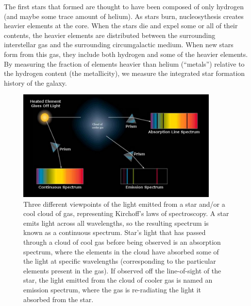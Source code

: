 The first stars that formed are thought to have been composed of only hydrogen 
(and maybe some trace amount of helium).  As stars burn, nucleosythesis creates 
heavier elements at the core.  When the stars die and expel some or all of their 
contents, the heavier elements are distributed between the surrounding 
interstellar gas and the surrounding circumgalactic medium.  When new stars form 
from this gas, they include both hydrogen and some of the heavier elements.  By 
measuring the fraction of elements heavier than helium (``metals'') relative to 
the hydrogen content (the metallicity), we measure the integrated star formation 
history of the galaxy.

\begin{figure}
    \includegraphics[width=0.9\textwidth]{Images/Intro/Kirchoff}
    \caption[Kirchoff's laws of spectroscopy]{Three different viewpoints of the 
    light emitted from a star and/or a cool cloud of gas, representing 
    Kirchoff's laws of spectroscopy.  A star emits light across all wavelengths, 
    so the resulting spectrum is known as a continuous spectrum.  Star's light 
    that has passed through a cloud of cool gas before being observed is an 
    absorption spectrum, where the elements in the cloud have absorbed some of 
    the light at specific wavelengths (corresponding to the particular elements 
    present in the gas).  If observed off the line-of-sight of the star, the 
    light emitted from the cloud of cooler gas is named an emission spectrum, 
    where the gas is re-radiating the light it absorbed from the star.}
    \label{fig:Kirchoff}
\end{figure}

